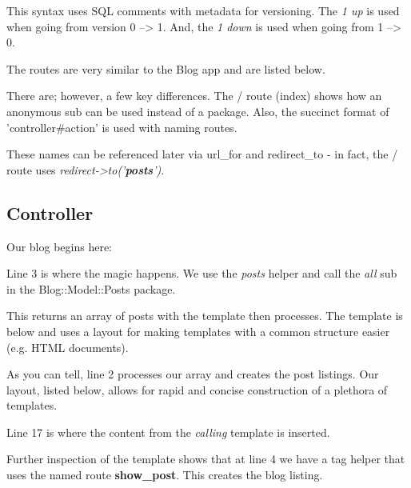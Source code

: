 \documentclass[14pt]{extreport}
\newcommand\Small{\fontsize{12}{13.0}\fontencoding{T1}\selectfont}
\newcommand*\LSTfont{\Small\ttfamily\SetTracking{encoding=*}{-60}\lsstyle}
\begin{document}
This syntax uses SQL comments with metadata for versioning.  The  \textit{1 up}
is used when going from version 0 --> 1.  And, the \textit{1 down} is used when
going from 1 --> 0.

The routes are very similar to the Blog app and are listed below.



There are; however, a few key differences.  The / route (index) shows how an
anonymous sub can be used instead of a package.  Also, the succinct format of
'controller\#action' is used with naming routes.  

These names can be referenced later via url\_for and redirect\_to - in fact,
the / route uses \textit{redirect->to('\textbf{posts}')}.

\subsection{Controller}

Our blog begins here:



Line 3 is where the magic happens. We use the \textit{posts} helper and call
the \textit{all} sub in the Blog::Model::Posts package.  



This returns an array of posts with the template then processes.  The template
is below and uses a layout for making templates with a common structure easier
(e.g. HTML documents).



As you can tell, line 2 processes our array and creates the post listings.  Our
layout, listed below, allows for rapid and concise construction of a plethora
of templates.



Line 17 is where the content from the \textit{calling} template is inserted.

Further inspection of the template shows that at line 4 we have a tag helper that
uses the named route \textbf{show\_post}.  This creates the blog listing.
\end{document}
